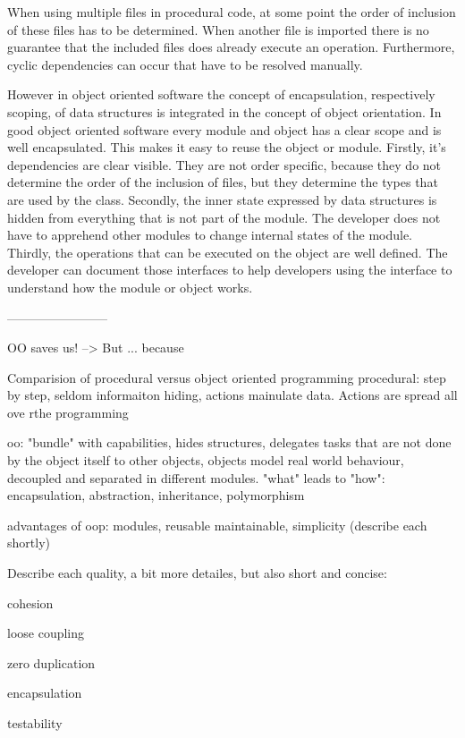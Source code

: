 When using multiple files in procedural code, at some point the order of inclusion of these files has to be determined. When another file is imported there is no guarantee that the included files does already execute an operation. Furthermore, cyclic dependencies can occur that have to be resolved manually. 

However in object oriented software the concept of encapsulation, respectively scoping, of data structures is integrated in the concept of object orientation.  In good object oriented software every module and object has a clear scope and is well encapsulated. This makes it easy to reuse the object or module. Firstly, it's dependencies are clear visible. They are not order specific, because they do not determine the order of the inclusion of files, but they determine the types that are used by the class. Secondly, the inner state expressed by data structures is hidden from everything that is not part of the module. The developer does not have to apprehend other modules to change internal states of the module. Thirdly, the operations that can be executed on the object are well defined. The developer can document those interfaces to help developers using the interface to understand how the module or object works.



------------------------



OO saves us! --> But ... because

Comparision of procedural versus object oriented programming
procedural: step by step, seldom informaiton hiding, actions mainulate data. Actions are spread all ove rthe programming

oo: "bundle" with capabilities, hides structures, delegates tasks that are not done by the object itself to other objects, objects model real world behaviour, decoupled and separated in different modules. "what" leads to "how": encapsulation, abstraction, inheritance, polymorphism

advantages of oop: modules, reusable maintainable, simplicity (describe each shortly) 

Describe each quality, a bit more detailes, but also short and concise: 

cohesion

loose coupling

zero duplication

encapsulation

testability

